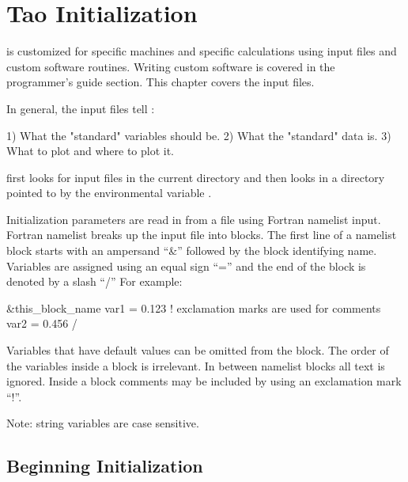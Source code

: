 \chapter{Tao Initialization}
\label{c:init}

\tao is customized for specific machines and specific calculations
using input files and custom software routines. Writing custom
software is covered in the programmer's guide section. This chapter
covers the input files.

In general, the input files tell \tao:
\begin{example}
  1) What the "standard" variables should be.
  2) What the "standard" data is.
  3) What to plot and where to plot it.
\end{example}

\tao first looks for input files in the current directory and then
looks in a directory pointed to by the environmental variable
.

Initialization parameters are read in from a file using Fortran
namelist input. Fortran namelist breaks up the input file into
blocks. The first line of a namelist block starts with an ampersand
``\&'' followed by the block identifying name. Variables are assigned
using an equal sign ``='' and the end of the block is denoted by a
slash ``/'' For example:
\begin{example}
  &this_block_name
    var1 = 0.123   ! exclamation marks are used for comments
    var2 = 0.456
  /
\end{example}
Variables that have default values can be omitted from the block.  The
order of the variables inside a block is irrelevant.  In between
namelist blocks all text is ignored. Inside a block comments may be
included by using an exclamation mark ``!''.

Note: string variables are case sensitive.

\section{Beginning Initialization}
\label{s:init_global} 


